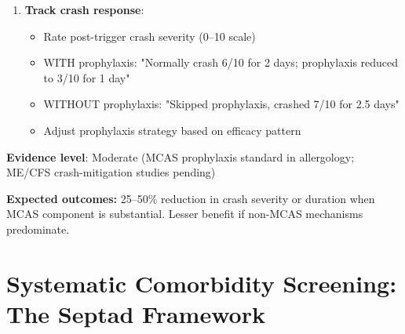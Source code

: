 \begin{recommendation}
\begin{enumerate}
\begin{itemize}
        \item \textbf{Strict low-histamine diet} (absolute 24 hours before through 24 hours after trigger):
        \begin{itemize}
            \item Eliminate all aged/fermented foods
            \item Only fresh foods prepared same-day
            \item Skip known personal food triggers
        \end{itemize}

        \item \textbf{Activity pacing intensification}:
        \begin{itemize}
            \item Reduce non-essential activities day-of trigger
            \item Maintain strict heart rate pacing limits
            \item Prioritize rest before and after high-demand event
        \end{itemize}
    \end{itemize}

    \item \textbf{Track crash response}:
    \begin{itemize}
        \item Rate post-trigger crash severity (0--10 scale)
        \item WITH prophylaxis: "Normally crash 6/10 for 2 days; prophylaxis reduced to 3/10 for 1 day"
        \item WITHOUT prophylaxis: "Skipped prophylaxis, crashed 7/10 for 2.5 days"
        \item Adjust prophylaxis strategy based on efficacy pattern
    \end{itemize}
\end{enumerate}

\textbf{Evidence level}: Moderate (MCAS prophylaxis standard in allergology; ME/CFS crash-mitigation studies pending)

\textbf{Expected outcomes:} 25--50\% reduction in crash severity or duration when MCAS component is substantial. Lesser benefit if non-MCAS mechanisms predominate.

\end{recommendation}

\section{Systematic Comorbidity Screening: The Septad Framework}
\label{sec:septad-screening-mild-moderate}

